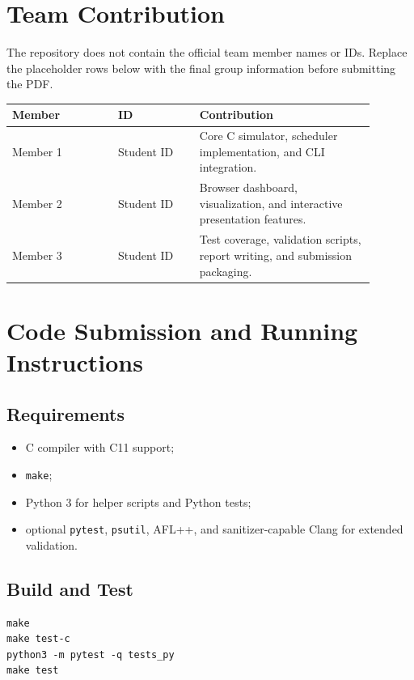 \documentclass[11pt]{article}
\begin{document}
\section{Team Contribution}

The repository does not contain the official team member names or IDs. Replace
the placeholder rows below with the final group information before submitting
the PDF.

\begin{longtable}{p{0.26\linewidth}p{0.20\linewidth}p{0.43\linewidth}}
\toprule
\textbf{Member} & \textbf{ID} & \textbf{Contribution} \\
\midrule
Member 1 & Student ID & Core C simulator, scheduler implementation, and CLI
integration. \\
Member 2 & Student ID & Browser dashboard, visualization, and interactive
presentation features. \\
Member 3 & Student ID & Test coverage, validation scripts, report writing, and
submission packaging. \\
\bottomrule
\end{longtable}

\section{Code Submission and Running Instructions}

\subsection{Requirements}

\begin{itemize}
  \item C compiler with C11 support;
  \item \texttt{make};
  \item Python 3 for helper scripts and Python tests;
  \item optional \texttt{pytest}, \texttt{psutil}, AFL++, and sanitizer-capable
  Clang for extended validation.
\end{itemize}

\subsection{Build and Test}

\begin{lstlisting}[style=terminal]
make
make test-c
python3 -m pytest -q tests_py
make test
\end{lstlisting}
\end{document}

